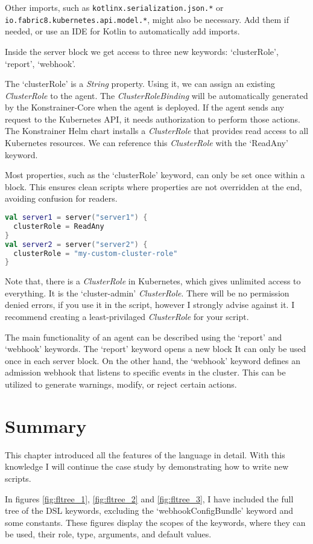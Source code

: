 Other imports, such as \lstinline|kotlinx.serialization.json.*| or \lstinline|io.fabric8.kubernetes.api.model.*|, might also be necessary. Add them if needed, or use an IDE for Kotlin to automatically add imports.

Inside the server block we get access to three new keywords: `clusterRole', `report', `webhook'.

The `clusterRole' is a \emph{String} property. Using it, we can assign an existing \emph{ClusterRole} to the agent. The \emph{ClusterRoleBinding} will be automatically generated by the Konstrainer-Core when the agent is deployed. If the agent sends any request to the Kubernetes API, it needs authorization to perform those actions. The Konstrainer Helm chart installs a \emph{ClusterRole} that provides read access to all Kubernetes resources. We can reference this \emph{ClusterRole} with the `ReadAny' keyword.

Most properties, such as the `clusterRole' keyword, can only be set once within a block. This ensures clean scripts where properties are not overridden at the end, avoiding confusion for readers.

\begin{lstlisting}[caption={Usage of the clusterRole keyword},language=Kotlin,label=code:clusterrole_usage]
val server1 = server("server1") {
  clusterRole = ReadAny
}
val server2 = server("server2") {
  clusterRole = "my-custom-cluster-role"
}
\end{lstlisting}

Note that, there is a \emph{ClusterRole} in Kubernetes, which gives unlimited access to everything. It is the `cluster-admin' \emph{ClusterRole}. There will be no permission denied errors, if you use it in the script, however I strongly advise against it. I recommend creating a least-privilaged \emph{ClusterRole} for your script.

The main functionality of an agent can be described using the `report' and `webhook' keywords. The `report' keyword opens a new block It can only be used once in each server block. On the other hand, the `webhook' keyword defines an admission webhook that listens to specific events in the cluster. This can be utilized to generate warnings, modify, or reject certain actions.





\section{Summary}

This chapter introduced all the features of the language in detail. With this knowledge I will continue the case study by demonstrating how to write new scripts.

In figures \ref{fig:fltree_1}, \ref{fig:fltree_2} and \ref{fig:fltree_3}, I have included the full tree of the DSL keywords, excluding the `webhookConfigBundle' keyword and some constants. These figures display the scopes of the keywords, where they can be used, their role, type, arguments, and default values.



